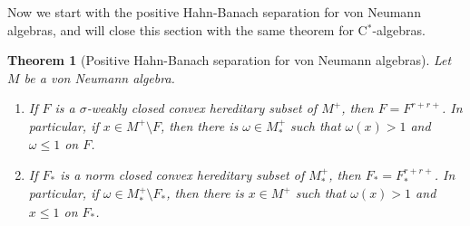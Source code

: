 \documentclass[a4paper]{amsart}
\theoremstyle{plain}
\newtheorem{thm}{Theorem}[section]
\theoremstyle{definition}
\begin{document}
Now we start with the positive Hahn-Banach separation for von Neumann algebras, and will close this section with the same theorem for C$^*$-algebras.


\begin{thm}[Positive Hahn-Banach separation for von Neumann algebras]\label{positive hahn-banach w*}
Let $M$ be a von Neumann algebra.
\begin{enumerate}
\item If $F$ is a $\sigma$-weakly closed convex hereditary subset of $M^+$, then $F=F^{r+r+}$. In particular, if $x\in M^+\setminus F$, then there is $\omega\in M_*^+$ such that $\omega(x)>1$ and $\omega\le1$ on $F$.
\item If $F_*$ is a norm closed convex hereditary subset of $M_*^+$, then $F_*=F_*^{r+r+}$. In particular, if $\omega\in M_*^+\setminus F_*$, then there is $x\in M^+$ such that $\omega(x)>1$ and $x\le1$ on $F_*$.
\end{enumerate}
\end{thm}
\end{document}
